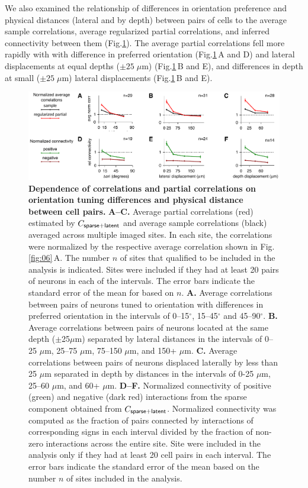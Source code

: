 \documentclass[10pt]{article}
\begin{document}
We also examined the relationship of differences in orientation preference and physical distances (lateral and by depth) between pairs of cells  to the average sample correlations, average regularized partial correlations, and inferred connectivity between them (Fig.\;\ref{fig:07}). The average partial correlations fell more rapidly with with difference in preferred orientation (Fig.\;\ref{fig:07}\,A and D) and lateral displacements at equal depths ($\pm 25\;\mu$m) (Fig.\;\ref{fig:07}\,B and E), and differences in depth at small ($\pm 25\;\mu$m) lateral displacements (Fig.\;\ref{fig:07}\,B and E).

\begin{figure}[!ht]
    \begin{center}
        \includegraphics{./figures/Figure07.pdf}
    \end{center}
    \caption{{\bf Dependence of correlations and partial correlations on orientation tuning differences and physical distance between cell pairs.}
    {\bf A--C.} Average partial correlations (red) estimated by $C_{\sf sparse+latent}$ and average sample correlations (black) averaged across multiple imaged sites. In each site, the correlations were normalized by the respective average correlation shown in Fig.\;\ref{fig:06}\,A.  The number $n$ of sites that qualified to be included in the analysis is indicated. Sites were included if they had at least 20 pairs of neurons in each of the intervals. The error bars indicate the standard error of the mean for based on $n$.
    {\bf A.} Average correlations between pairs of neurons tuned to orientation with differences in preferred orientation in the intervals of 0--15$^\circ$, 15--45$^\circ$ and 45--90$^\circ$. 
    {\bf B.} Average correlations between pairs of neurons located at the same depth ($\pm$25$\mu$m) separated by lateral distances in the intervals of 0--25 $\mu$m, 25--75 $\mu$m, 75--150 $\mu$m, and 150+ $\mu$m.
    {\bf C.} Average correlations between pairs of neurons displaced laterally by less than 25 $\mu$m separated in depth by distances in the intervals of 0-25 $\mu$m, 25--60 $\mu$m, and 60+ $\mu$m.
    {\bf D--F.} Normalized connectivity of positive (green) and negative (dark red) interactions from the sparse component obtained from $C_{\sf sparse+latent}$. Normalized connectivity was computed as the fraction of pairs connected by interactions of corresponding signs in each interval divided by the fraction of non-zero interactions across the entire site. Site were included in the analysis only if they had at least 20 cell pairs in each interval. The error bars indicate the standard error of the mean based on the number $n$ of sites included in the analysis.
}
\label{fig:07}
\end{figure}
\end{document}
